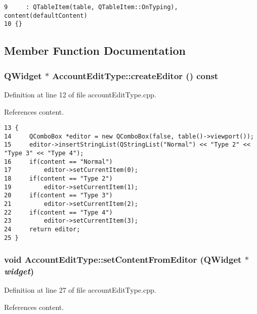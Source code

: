 \footnotesize\begin{verbatim}9     : QTableItem(table, QTableItem::OnTyping), content(defaultContent)
10 {}
\end{verbatim}\normalsize 




\subsection{Member Function Documentation}
\hypertarget{classAccountEditType_a1}{
\subsubsection[createEditor]{\setlength{\rightskip}{0pt plus 5cm}QWidget $\ast$ Account\-Edit\-Type::create\-Editor () const}}
\label{classAccountEditType_a1}


Definition at line 12 of file account\-Edit\-Type.cpp.

References content.

\footnotesize\begin{verbatim}13 {
14     QComboBox *editor = new QComboBox(false, table()->viewport());
15     editor->insertStringList(QStringList("Normal") << "Type 2" << "Type 3" << "Type 4");
16     if(content == "Normal")
17         editor->setCurrentItem(0);
18     if(content == "Type 2")
19         editor->setCurrentItem(1);
20     if(content == "Type 3")
21         editor->setCurrentItem(2);
22     if(content == "Type 4")
23         editor->setCurrentItem(3);
24     return editor;
25 }
\end{verbatim}\normalsize 


\hypertarget{classAccountEditType_a2}{
\subsubsection[setContentFromEditor]{\setlength{\rightskip}{0pt plus 5cm}void Account\-Edit\-Type::set\-Content\-From\-Editor (QWidget $\ast$ {\em widget})}}
\label{classAccountEditType_a2}


Definition at line 27 of file account\-Edit\-Type.cpp.

References content.

